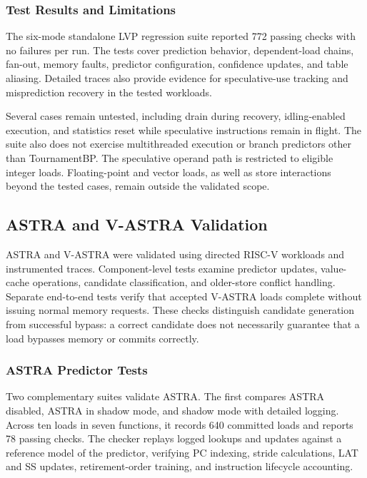 \subsubsection{Test Results and Limitations}

The six-mode standalone LVP regression suite reported 772 passing
checks with no failures per run. The tests cover prediction behavior,
dependent-load chains, fan-out, memory faults, predictor
configuration, confidence updates, and table aliasing. Detailed
traces also provide evidence for speculative-use tracking and
misprediction recovery in the tested workloads.

Several cases remain untested, including drain during recovery,
idling-enabled execution, and statistics reset while speculative
instructions remain in flight. The suite also does not exercise
multithreaded execution or branch predictors other than TournamentBP.
The speculative operand path is restricted to eligible integer loads.
Floating-point and vector loads, as well as store interactions beyond
the tested cases, remain outside the validated scope.

\subsection{ASTRA and V-ASTRA Validation}
\label{subsec:astra-vastra-validation}

ASTRA and V-ASTRA were validated using directed RISC-V workloads
and instrumented traces. Component-level tests examine predictor
updates, value-cache operations, candidate classification, and
older-store conflict handling. Separate end-to-end tests verify
that accepted V-ASTRA loads complete without issuing normal memory
requests. These checks distinguish candidate generation from
successful bypass: a correct candidate does not necessarily
guarantee that a load bypasses memory or commits correctly.

\subsubsection{ASTRA Predictor Tests}
\label{subsubsec:astra-validation}

Two complementary suites validate ASTRA. The first compares
ASTRA disabled, ASTRA in shadow mode, and shadow mode with detailed
logging. Across ten loads in seven
functions, it records 640 committed loads and reports 78 passing
checks. The checker replays logged lookups and updates against a
reference model of the predictor, verifying PC indexing, stride calculations,
LAT and SS updates, retirement-order training, and instruction
lifecycle accounting.

